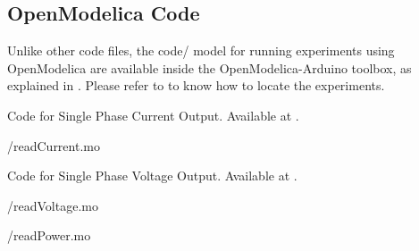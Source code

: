 \subsection{OpenModelica Code}
Unlike other code files, the code/ model for running experiments using OpenModelica are available inside the OpenModelica-Arduino toolbox, as explained in . Please refer to  to know how to locate the experiments.

\label{sec:modbus-OpenModelica-code}

\begin{OpenModelicacode}
    {Code for Single Phase Current Output.
        Available at .}
    \label{OpenModelica:current-modbus}
    
    {\LocMODOpenModelicacode/readCurrent.mo}
\end{OpenModelicacode}

\begin{OpenModelicacode}
    {Code for Single Phase Voltage Output.
        Available at .}
    \label{OpenModelica:voltage-modbus}
    
    {\LocMODOpenModelicacode/readVoltage.mo}
\end{OpenModelicacode}

\begin{OpenModelicacode}
    \label{OpenModelica:modbus-power}
    
    {\LocMODOpenModelicacode/readPower.mo}
\end{OpenModelicacode}
